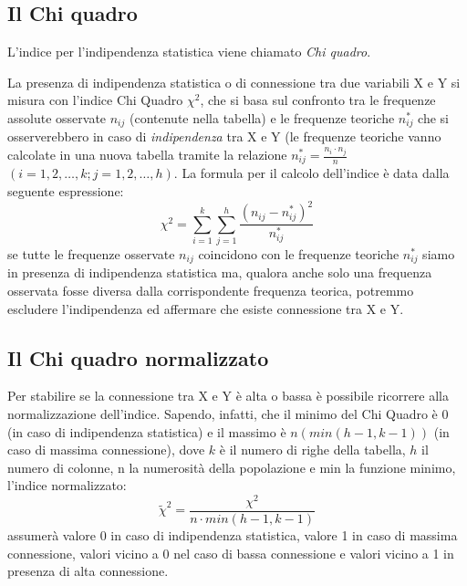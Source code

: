 \subsection{Il Chi quadro}

L'indice per l'indipendenza statistica viene chiamato \emph{Chi quadro}.

La presenza di indipendenza statistica o di connessione tra due variabili X 
e Y si misura con l'indice Chi Quadro $\chi^2$, che si basa sul confronto 
tra le frequenze assolute osservate  $n_{ij}$ (contenute nella tabella) e 
le frequenze teoriche $n^*_{ij}$ che si osserverebbero in caso di 
\emph{indipendenza} tra X e Y (le frequenze teoriche vanno calcolate 
in una nuova tabella  tramite la relazione $n^*_{ij}=\frac{n_i\cdot 
n_j}{n}$ $(i=1,2,\dots,k; j=1,2,\dots,h)$. La formula per il calcolo 
dell'indice è data dalla seguente espressione: 
\[\chi^2 = \sum_{i=1}^{k}\sum_{j=1}^{h}\frac{\left(n_{ij}-n^*_{ij}\right) 
^2}{n^*_{ij}}\]
se tutte le frequenze osservate $n_{ij}$ coincidono con le frequenze 
teoriche $n^*_{ij}$ siamo in presenza di indipendenza statistica ma, 
qualora anche solo una frequenza osservata fosse diversa dalla 
corrispondente frequenza teorica, potremmo escludere l'indipendenza ed 
affermare che esiste connessione tra X e Y.

\subsection{Il Chi quadro normalizzato}

 Per stabilire se la connessione tra X e Y è alta o bassa è possibile 
ricorrere alla normalizzazione dell'indice. Sapendo, infatti, che il minimo 
del Chi Quadro è 0 (in caso di indipendenza statistica) e il massimo è 
$n(min(h-1,k-1))$  (in caso di massima connessione), dove $k$ è il numero 
di righe della tabella, $h$ il numero di colonne, n la numerosità della 
popolazione e min la funzione minimo, l'indice normalizzato:
 $$\widetilde{\chi}^2=\frac{\chi^2}{n\cdot min(h-1,k-1)}$$
 assumerà valore 0 in caso di indipendenza statistica, valore 1 in caso di 
massima connessione, valori vicino a 0 nel caso di bassa connessione e 
valori vicino a 1 in presenza di alta connessione.

